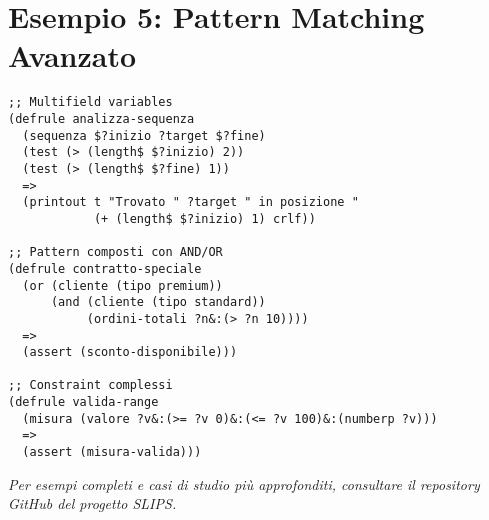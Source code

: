 \section{Esempio 5: Pattern Matching Avanzato}

\begin{lstlisting}[language=CLIPS]
;; Multifield variables
(defrule analizza-sequenza
  (sequenza $?inizio ?target $?fine)
  (test (> (length$ $?inizio) 2))
  (test (> (length$ $?fine) 1))
  =>
  (printout t "Trovato " ?target " in posizione " 
            (+ (length$ $?inizio) 1) crlf))

;; Pattern composti con AND/OR
(defrule contratto-speciale
  (or (cliente (tipo premium))
      (and (cliente (tipo standard))
           (ordini-totali ?n&:(> ?n 10))))
  =>
  (assert (sconto-disponibile)))

;; Constraint complessi
(defrule valida-range
  (misura (valore ?v&:(>= ?v 0)&:(<= ?v 100)&:(numberp ?v)))
  =>
  (assert (misura-valida)))
\end{lstlisting}

\textit{Per esempi completi e casi di studio più approfonditi, consultare il repository GitHub del progetto SLIPS.}

